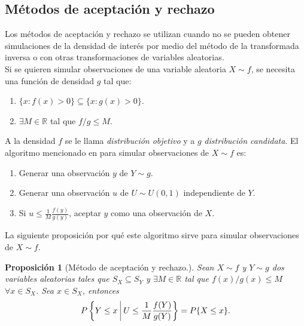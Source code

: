 \documentclass[11pt,a4paper]{article}
\newtheorem{proposition}{Proposición}[subsection]
\begin{document}
\subsection{Métodos de aceptación y rechazo}
\label{aceptacion}

Los métodos de aceptación y rechazo se utilizan cuando no se pueden obtener simulaciones de la densidad de interés por medio del método de la transformada inversa o con otras transformaciones de variables aleatorias.\\

Si se quieren simular observaciones de una variable aleatoria $X\sim f$, se necesita una función de densidad $g$ tal que:

\begin{enumerate}
\item $\{x: f(x) > 0\}\subseteq \{x: g(x) > 0\}$.\\
\item $\exists M \in \mathbb{R}$ tal que $f/g \leq M.$
\end{enumerate}

A la densidad $f$ se le llama \textit{distribución objetivo} y a $g$ \textit{distribución candidata}. El algoritmo mencionado en \citet{casella} para simular observaciones de $X \sim f$ es:

\begin{enumerate}
\item Generar una observación $y$ de $Y\sim g$.
\item Generar una observación $u$ de $U\sim U(0,1)$ independiente de $Y$.
\item Si $u \leq \frac{1}{M}\frac{f(y)}{g(y)}$, aceptar $y$ como una observación de $X$.
\end{enumerate}

La siguiente proposición por qué este algoritmo sirve para simular observaciones de $X \sim f$.\\

\begin{proposition}[Método de aceptación y rechazo.] Sean $X\sim f$ y $Y \sim g$ dos variables aleatorias tales que $S_X \subseteq S_Y$ y $\exists M \in \mathbb{R}$ tal que $f(x)/g(x) \leq M$ $\forall x \in S_X$. Sea $x \in S_X$, entonces $$P\left\lbrace Y \leq x \  \vline \ U\leq \frac{1}{M}\frac{f(Y)}{g(Y)}\right\rbrace = P\{X\leq x\}.$$
\end{proposition}
\end{document}
